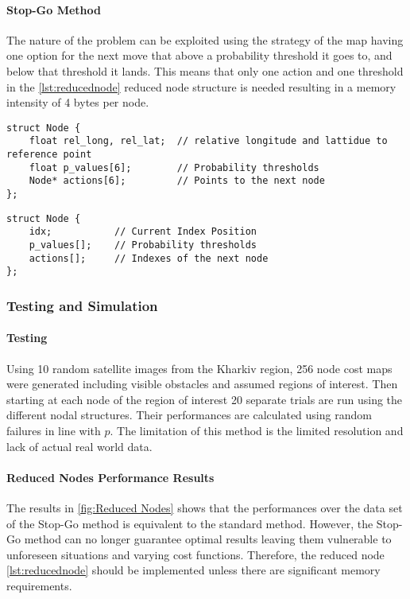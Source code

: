 \paragraph{Stop-Go Method}
The nature of the problem can be exploited using the strategy of the map having one option for the next move that above a probability threshold it goes to, and below that threshold it lands. This means that only one action and one threshold in the \ref{lst:reducednode} reduced node structure is needed resulting in a memory intensity of 4 bytes per node.
\begin{lstlisting}[caption={Implementated Node Structure},label={lst:node}]
struct Node {
    float rel_long, rel_lat;  // relative longitude and lattidue to reference point
    float p_values[6];        // Probability thresholds
    Node* actions[6];         // Points to the next node
};
\end{lstlisting}
\begin{lstlisting}[caption={Node Structure},label={lst:reducednode}]
struct Node {
    idx;           // Current Index Position
    p_values[];    // Probability thresholds
    actions[];     // Indexes of the next node
};
\end{lstlisting}
\subsubsection{Testing and Simulation}\label{sub_sub_section:tgt_testing_sims}
\paragraph{Testing}
Using 10 random satellite images from the Kharkiv region, 256 node cost maps were generated including visible obstacles and assumed regions of interest. Then starting at each node of the region of interest 20 separate trials are run using the different nodal structures. Their performances are calculated using random failures in line with $p$. The limitation of this method is the limited resolution and lack of actual real world data.
\paragraph{Reduced Nodes Performance Results}
The results in \ref{fig:Reduced Nodes} shows that the performances over the data set of the Stop-Go method is equivalent to the standard method. However, the Stop-Go method can no longer guarantee optimal results leaving them vulnerable to unforeseen situations and varying cost functions. Therefore, the reduced node \ref{lst:reducednode} should be implemented unless there are significant memory requirements.

